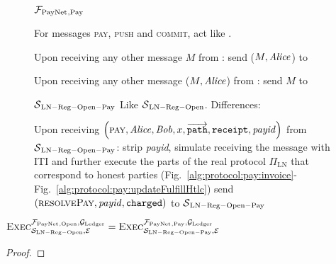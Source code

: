 \begin{figure}[H]
  \begin{systembox}{$\mathcal{F}_{\mathrm{PayNet}}{}_{\mathrm{, Pay}}$}
    \begin{algorithmic}[1]
      \State For messages \textsc{pay}, \textsc{push} and \textsc{commit}, act
      like \fpaynet{}.
      \Statex

      \State Upon receiving any other message $M$ from \alice:
      \Indent
          \State send ($M, \mathit{Alice}$) to \simulator
        \EndIf
      \EndIndent
      \Statex

      \State Upon receiving any other message ($M, \mathit{Alice}$) from \simulator:
      \Indent
          \State send $M$ to \alice
        \EndIf
      \EndIndent
    \end{algorithmic}
  \end{systembox}
  \caption{}
  \label{alg:proof:fpaynet:pay}
\end{figure}

\begin{figure}[H]
  \begin{simulatorbox}{$\mathcal{S}{}_{\mathrm{LN - Reg - Open - Pay}}$}
    Like $\mathcal{S}{}_{\mathrm{LN - Reg - Open}}$. Differences:
    \begin{algorithmic}[1]
      \State Upon receiving $\left(\textsc{pay}, \mathit{Alice}, \mathit{Bob}, x,
      \overrightarrow{\mathtt{path}}, \mathtt{receipt}, \mathit{payid}\right)$
      from $\mathcal{S}{}_{\mathrm{LN - Reg - Open - Pay}}$:
      \Indent
        \State strip \textit{payid}, simulate receiving the message with
        \alice{} ITI and further execute the parts of the real protocol
        $\Pi_{\mathrm{LN}}$ that correspond to honest parties
        (Fig.~\ref{alg:protocol:pay:invoice}-
        Fig.~\ref{alg:protocol:pay:updateFulfillHtlc})
        \State {} 
        \State send $\left(\textsc{resolvePay}, \mathit{payid},
        \mathtt{charged}\right)$ to $\mathcal{S}{}_{\mathrm{LN - Reg - Open -
        Pay}}$
      \EndIndent
    \end{algorithmic}
  \end{simulatorbox}
  \caption{}
  \label{alg:sim:pay}
\end{figure}

\begin{lemma}
  \label{lemma:pay}
  $\textsc{Exec}^{\mathcal{F}_{\mathrm{PayNet}}{}_{\mathrm{, Open}},
  \mathcal{G}_{\mathrm{Ledger}}}_{\mathcal{S}_{\mathrm{LN - Reg - Open}}, \mathcal{E}} =
  \textsc{Exec}^{\mathcal{F}_{\mathrm{PayNet}}{}_{\mathrm{, Pay}}, \mathcal{G}_{\mathrm{Ledger}}}_{\mathcal{S}_{\mathrm{LN
  - Reg - Open - Pay}}, \mathcal{E}}$
\end{lemma}

\begin{proof}
\end{proof}
